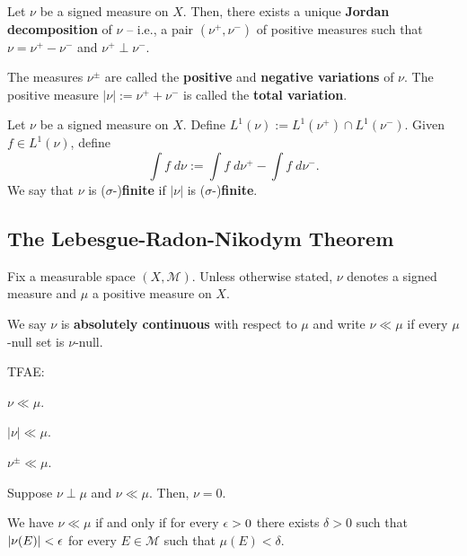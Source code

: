 \documentclass[11pt]{article}
\newcommand{\M}{\mathcal{M}}
\begin{document}
\begin{theorem}
Let $\nu$ be a signed measure on $X$. Then, there exists a unique \textbf{Jordan decomposition} of $\nu$ -- i.e., a pair $(\nu^+,\nu^-)$ of positive measures such that $\nu=\nu^+-\nu^-$ and $\nu^+\perp\nu^-$.
\end{theorem}

The measures $\nu^{\pm}$ are called the \textbf{positive} and \textbf{negative variations} of $\nu$. The positive measure $|\nu|:=\nu^++\nu^-$ is called the \textbf{total variation}.

\begin{definition}
Let $\nu$ be a signed measure on $X$. Define $L^1(\nu):=L^1(\nu^+)\cap L^1(\nu^-)$. Given $f\in L^1(\nu)$, define 
$$\int f\;d\nu:=\int f\;d\nu^+-\int f\;d\nu^-.$$
We say that $\nu$ is ($\sigma$-)\textbf{finite} if $|\nu|$ is ($\sigma$-)\textbf{finite}.
\end{definition}

\subsection{The Lebesgue-Radon-Nikodym Theorem}
Fix a measurable space $(X,\M)$. Unless otherwise stated, $\nu$ denotes a signed measure and $\mu$ a positive measure on $X$.

\begin{definition}
We say $\nu$ is \textbf{absolutely continuous} with respect to $\mu$ and write $\nu\ll\mu$ if every $\mu$-null set is $\nu$-null.
\end{definition}

\begin{proposition}
TFAE:
\begin{enum}{\roman}
\item $\nu\ll\mu$.
\item $|\nu|\ll\mu$.
\item $\nu^{\pm}\ll\mu$.
\end{enum}
\end{proposition}

\begin{proposition}
Suppose $\nu\perp\mu$ and $\nu\ll\mu$. Then, $\nu=0$.
\end{proposition}

\begin{theorem}
We have $\nu\ll\mu$ if and only if for every $\epsilon>0$ there exists $\delta>0$ such that $|\nu(E)|<\epsilon$ for every $E\in\M$ such that $\mu(E)<\delta$.
\end{theorem}
\end{document}
